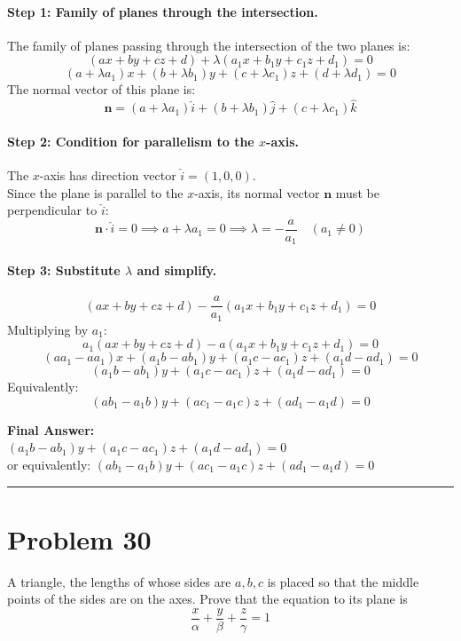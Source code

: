 \documentclass[11pt,a4paper]{article}
\begin{document}
\paragraph{Step 1: Family of planes through the intersection.}
The family of planes passing through the intersection of the two planes is:
$$(ax + by + cz + d) + \lambda(a_1 x + b_1 y + c_1 z + d_1) = 0$$
$$(a + \lambda a_1)x + (b + \lambda b_1)y + (c + \lambda c_1)z + (d + \lambda d_1) = 0$$
The normal vector of this plane is:
$$\mathbf{n} = (a + \lambda a_1)\hat{i} + (b + \lambda b_1)\hat{j} + (c + \lambda c_1)\hat{k}$$

\paragraph{Step 2: Condition for parallelism to the $x$-axis.}
The $x$-axis has direction vector $\hat{i} = (1, 0, 0)$.\\
Since the plane is parallel to the $x$-axis, its normal vector $\mathbf{n}$ must be perpendicular to $\hat{i}$:
$$\mathbf{n} \cdot \hat{i} = 0 \implies a + \lambda a_1 = 0 \implies \lambda = -\frac{a}{a_1} \quad (a_1 \neq 0)$$

\paragraph{Step 3: Substitute $\lambda$ and simplify.}
$$(ax + by + cz + d) - \frac{a}{a_1}(a_1 x + b_1 y + c_1 z + d_1) = 0$$
Multiplying by $a_1$:
$$a_1(ax + by + cz + d) - a(a_1 x + b_1 y + c_1 z + d_1) = 0$$
$$(a a_1 - a a_1)x + (a_1 b - a b_1)y + (a_1 c - a c_1)z + (a_1 d - a d_1) = 0$$
$$(a_1 b - a b_1)y + (a_1 c - a c_1)z + (a_1 d - a d_1) = 0$$
Equivalently:
$$(a b_1 - a_1 b)y + (a c_1 - a_1 c)z + (a d_1 - a_1 d) = 0$$

\begin{resultbox}
\textbf{Final Answer:}\\
$\boxed{(a_1 b - a b_1)y + (a_1 c - a c_1)z + (a_1 d - a d_1) = 0}$\\
or equivalently: $\boxed{(a b_1 - a_1 b)y + (a c_1 - a_1 c)z + (a d_1 - a_1 d) = 0}$
\end{resultbox}

\vspace{0.4cm}
\hrule
\vspace{0.4cm}

\section{Problem 30}
\begin{problembox}[Problem 30]
A triangle, the lengths of whose sides are $a, b, c$ is placed so that the middle points of the sides are on the axes. Prove that the equation to its plane is
$$\frac{x}{\alpha} + \frac{y}{\beta} + \frac{z}{\gamma} = 1$$
\end{problembox}
\end{document}
